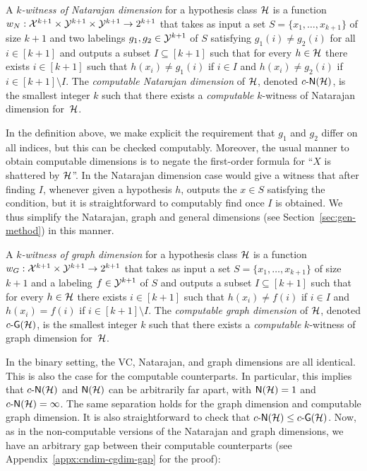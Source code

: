\documentclass[11pt]{article}
\begin{document}
\begin{definition}
\label{def:c-natarajan}
A \emph{$k$-witness of Natarajan dimension} for a hypothesis class $\mathcal{H}$ is a function $w_{N}:\mathcal{X}^{k+1}\times\mathcal{Y}^{k+1}\times\mathcal{Y}^{k+1}\rightarrow 2^{k+1}$ that takes as input a set $S=\{x_1,\dots,x_{k+1}\}$ of size $k+1$ and two labelings $g_1,g_2\in\mathcal{Y}^{k+1}$ of $S$ satisfying $g_1(i)\neq g_2(i)$ for all $i\in [k+1]$ and outputs a subset $I\subseteq [k+1]$ such that for every $h\in\mathcal{H}$ there exists $i\in [k+1]$ such that $h(x_i)\neq g_1(i)$ if $i\in I$ and $h(x_i)\neq g_2(i)$ if $i\in [k+1]\setminus I$.
The \emph{computable Natarajan dimension} of $\mathcal{H}$, denoted $c\text{-}\mathsf{N}(\mathcal{H})$, is the smallest integer $k$ such that there exists a \emph{computable} $k$-witness of  Natarajan dimension for~$\mathcal{H}$. \end{definition}

\begin{remark}
    In the definition above, we make explicit the requirement that $g_1$ and $g_2$ differ on all indices, but this can be checked computably. 
    Moreover, the usual manner to obtain computable dimensions is to negate the first-order formula for ``$X$ is shattered by $\mathcal{H}$''. 
    In the Natarajan dimension case would give a witness that after finding $I$, whenever given a hypothesis $h$, outputs the $x\in S$ satisfying the condition, but it is straightforward to computably find once $I$ is obtained. 
    We thus simplify the Natarajan, graph and general dimensions (see Section~\ref{sec:gen-method}) in this manner.
\end{remark}


\begin{definition}
    A \emph{$k$-witness of graph dimension} for a hypothesis class $\mathcal{H}$ is a function $w_{G}:\mathcal{X}^{k+1}\times\mathcal{Y}^{k+1}\rightarrow 2^{k+1}$ that takes as input a set $S=\{x_1,\dots,x_{k+1}\}$ of size $k+1$ and a labeling $f\in\mathcal{Y}^{k+1}$ of $S$ and outputs a subset $I\subseteq [k+1]$ such that for every $h\in\mathcal{H}$ there exists $i\in [k+1]$ such that $h(x_i)\neq f(i)$ if $i\in I$ and $h(x_i)= f(i)$ if $i\in [k+1]\setminus I$.
    The \emph{computable graph dimension} of $\mathcal{H}$, denoted $c\text{-}\mathsf{G}(\mathcal{H})$, is the smallest integer $k$ such that there exists a \emph{computable} $k$-witness of  graph dimension for~$\mathcal{H}$.
\end{definition}

In the binary setting, the VC, Natarajan,  and graph dimensions are all identical.
This is also the case for the computable counterparts. In particular, this implies that $c\text{-}\mathsf{N}(\mathcal{H})$ and $\mathsf{N}(\mathcal{H})$ can be arbitrarily far apart, with $\mathsf{N}(\mathcal{H})=1$ and $c\text{-}\mathsf{N}(\mathcal{H}) =\infty $. The same separation holds for the graph dimension and computable graph dimension.
It is also straightforward to check that $c\text{-}\mathsf{N}(\mathcal{H})\leq c\text{-}\mathsf{G}(\mathcal{H})$.
Now, as in the non-computable versions of the Natarajan and graph dimensions, we have an arbitrary gap between their computable counterparts (see Appendix~\ref{appx:cndim-cgdim-gap} for the proof):
\end{document}
